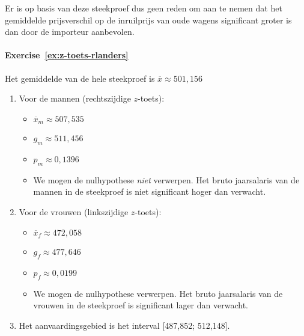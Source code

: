 Er is op basis van deze steekproef dus geen reden om aan te nemen dat het gemiddelde prijsverschil op de inruilprijs van oude wagens significant groter is dan door de importeur aanbevolen.

\paragraph{Exercise~\ref{ex:z-toets-rlanders}}

Het gemiddelde van de hele steekproef is $\overline{x} \approx 501,156$

\begin{enumerate}
  \item Voor de mannen (rechtszijdige $z$-toets):
    \begin{itemize}
      \item $\overline{x}_m \approx 507,535$
      \item $g_m \approx 511,456$
      \item $p_m \approx 0,1396$
      \item We mogen de nulhypothese \textit{niet} verwerpen. Het bruto jaarsalaris van de mannen in de steekproef is niet significant hoger dan verwacht.
    \end{itemize}
  \item Voor de vrouwen (linkszijdige $z$-toets):
    \begin{itemize}
      \item $\overline{x}_f \approx 472,058$
      \item $g_f \approx 477,646$
      \item $p_f \approx 0,0199$
      \item We mogen de nulhypothese verwerpen. Het bruto jaarsalaris van de vrouwen in de steekproef is significant lager dan verwacht.
    \end{itemize}
  \item Het aanvaardingsgebied is het interval [487,852; 512,148]. 
\end{enumerate}
